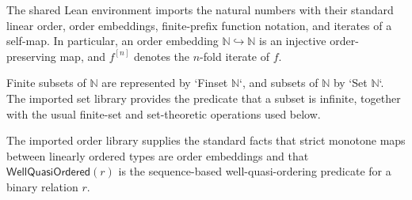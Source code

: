 \begin{definition}
The shared Lean environment imports the natural numbers with their standard
linear order, order embeddings, finite-prefix function notation, and iterates
of a self-map.  In particular, an order embedding $\mathbb N\hookrightarrow
\mathbb N$ is an injective order-preserving map, and $f^{[n]}$ denotes the
$n$-fold iterate of $f$.
\end{definition}

\begin{definition}
Finite subsets of $\mathbb N$ are represented by `Finset $\mathbb N$`, and
subsets of $\mathbb N$ by `Set $\mathbb N$`.  The imported set library
provides the predicate that a subset is infinite, together with the usual
finite-set and set-theoretic operations used below.
\end{definition}

\begin{proposition}
The imported order library supplies the standard facts that strict monotone
maps between linearly ordered types are order embeddings and that
$\mathsf{WellQuasiOrdered}(r)$ is the sequence-based well-quasi-ordering
predicate for a binary relation $r$.
\end{proposition}
